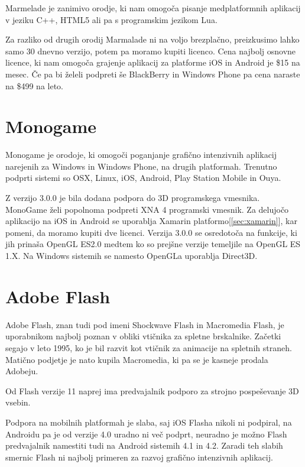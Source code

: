 Marmelade je zanimivo orodje, ki nam omogoča pisanje medplatformnih aplikacij v jeziku C++, HTML5 ali pa s programskim jezikom Lua.

Za razliko od drugih orodij Marmalade ni na voljo brezplačno, preizkusimo lahko samo 30 dnevno verzijo, potem pa moramo kupiti licenco. Cena najbolj osnovne licence, ki nam omogoča grajenje aplikacij za platforme iOS in Android je \$15 na mesec. Če pa bi želeli podpreti še BlackBerry in Windows Phone pa cena naraste na \$499 na leto.



\section{Monogame}

Monogame je orodoje, ki omogoči poganjanje grafično intenzivnih aplikacij narejenih za Windows in Windows Phone, na drugih platformah. Trenutno podprti sistemi so OSX, Linux, iOS, Android, Play Station Mobile in Ouya. 

Z verzijo 3.0.0 je bila dodana podpora do 3D programskega vmesnika. MonoGame želi popolnoma podpreti XNA 4 programski vmesnik. Za delujočo aplikacijo na iOS in Android se uporablja Xamarin platformo[\ref{sec:xamarin}], kar pomeni, da moramo kupiti dve licenci. Verzija 3.0.0 se osredotoča na funkcije, ki jih prinaša OpenGL ES2.0 medtem ko so prejšne verzije temeljile na OpenGL ES 1.X. Na Windows sistemih se namesto OpenGLa uporablja Direct3D.

\section{Adobe Flash}

Adobe Flash, znan tudi pod imeni Shockwave Flash in Macromedia Flash, je uporabnikom najbolj poznan v obliki vtičnika za spletne brskalnike. Začetki segajo v leto 1995, ko je bil razvit kot vtičnik za animacije na spletnih straneh. Matično podjetje je nato kupila Macromedia, ki pa se je kasneje prodala Adobeju.   

Od Flash verzije 11 naprej ima predvajalnik podporo za strojno pospeševanje 3D vsebin.

Podpora na mobilnih platformah je slaba, saj iOS Flasha nikoli ni podpiral, na Androidu pa je od verzije 4.0 uradno ni več podprt, neuradno je možno Flash predvajalnik namestiti tudi na Android sistemih 4.1 in 4.2. Zaradi teh slabih smernic Flash ni najbolj primeren za razvoj grafično intenzivnih aplikacij.

